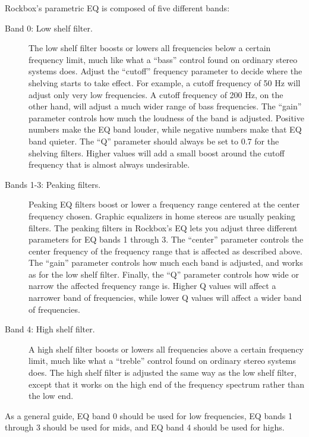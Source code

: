 {  Rockbox's parametric EQ is composed of five different bands:
  \begin{description}
  \item[Band 0: Low shelf filter.]
        The low shelf filter boosts or lowers all frequencies below a certain
        frequency limit, much like what a ``bass'' control found on ordinary
        stereo systems does.
        Adjust the ``cutoff'' frequency parameter to decide where the shelving
        starts to take effect. For example, a cutoff frequency of 50 Hz will
        adjust only very low frequencies. A cutoff frequency of 200 Hz, on the
        other hand, will adjust a much wider range of bass frequencies.
        The ``gain'' parameter controls how much the loudness of the band is
        adjusted. Positive numbers make the EQ band louder, while negative
        numbers make that EQ band quieter.
        The ``Q'' parameter should always be set to 0.7 for the shelving
        filters. Higher values will add a small boost around the cutoff
        frequency that is almost always undesirable.
  \item[Bands 1-3: Peaking filters.]
        Peaking EQ filters boost or lower a frequency range centered at the
        center frequency chosen.
        Graphic equalizers in home stereos are usually peaking
        filters. The peaking filters in Rockbox's EQ lets you adjust three
        different parameters for EQ bands 1 through 3. The ``center'' parameter
        controls the center frequency of the frequency range that is affected
        as described above.
        The ``gain'' parameter controls how much each band is adjusted, and
        works as for the low shelf filter.
        Finally, the ``Q'' parameter controls how wide or narrow the affected
        frequency range is. Higher Q values will affect a narrower band of
        frequencies, while lower Q values will affect a wider band of
        frequencies.
  \item[Band 4: High shelf filter.]
        A high shelf filter boosts or lowers all frequencies above a certain
        frequency limit, much like what a ``treble'' control found on ordinary
        stereo systems does.
        The high shelf filter is adjusted the same way as the low shelf filter,
        except that it works on the high end of the frequency spectrum rather
        than the low end.
  \end{description}
  As a general guide, EQ band 0 should be used for low frequencies, EQ bands 1
  through 3 should be used for mids, and EQ band 4 should be used for highs.

}
